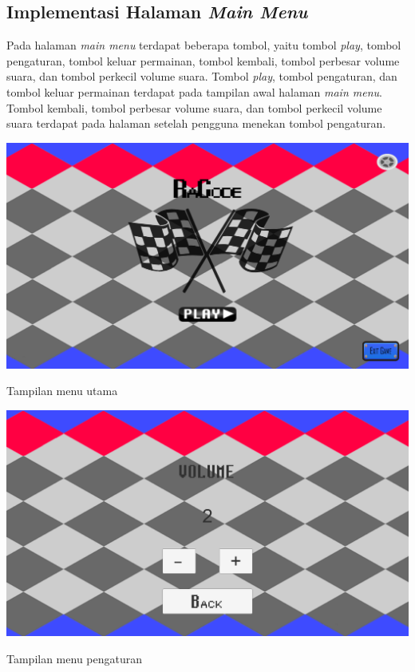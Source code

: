 	\subsection{Implementasi Halaman \textit{Main Menu}}
	Pada halaman \textit{main menu} terdapat beberapa tombol, yaitu tombol \textit{play}, tombol pengaturan, tombol keluar permainan, tombol kembali, tombol perbesar volume suara, dan tombol perkecil volume suara. Tombol \textit{play}, tombol pengaturan, dan tombol keluar permainan terdapat pada tampilan awal halaman \textit{main menu}. Tombol kembali, tombol perbesar volume suara, dan tombol perkecil volume suara terdapat pada halaman setelah pengguna menekan tombol pengaturan.
	\begin{table}
		\centering
		\includegraphics[width=\linewidth-40pt]{pics/prototipe/menu1}
		\caption{Tampilan menu utama}
	\end{table}
	\begin{table}
		\centering
		\includegraphics[width=\linewidth-40pt]{pics/prototipe/menu2}
		\caption{Tampilan menu pengaturan}
	\end{table}
